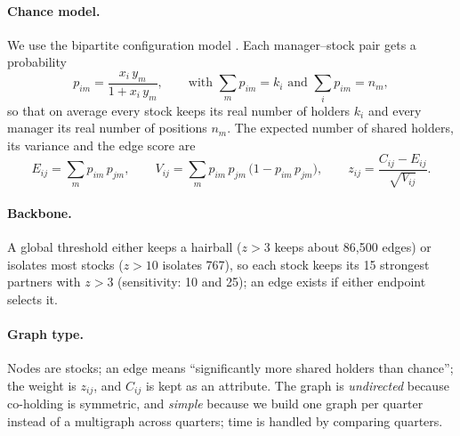 \documentclass[10pt,a4paper]{article}
\begin{document}
\paragraph{Chance model.} We use the bipartite configuration model \cite{saracco2015,saracco2017}. Each manager--stock pair gets a probability
\begin{equation}
  p_{im} = \frac{x_i\, y_m}{1 + x_i\, y_m},
  \qquad \text{with } \sum_m p_{im} = k_i \text{ and } \sum_i p_{im} = n_m ,
\end{equation}
so that on average every stock keeps its real number of holders $k_i$ and every manager its real number of positions $n_m$. The expected number of shared holders, its variance and the edge score are
\begin{equation}
  E_{ij} = \sum_m p_{im}\,p_{jm}, \qquad
  V_{ij} = \sum_m p_{im}\,p_{jm}\,\bigl(1 - p_{im}\,p_{jm}\bigr), \qquad
  z_{ij} = \frac{C_{ij} - E_{ij}}{\sqrt{V_{ij}}} .
\end{equation}

\paragraph{Backbone.} A global threshold either keeps a hairball ($z>3$ keeps about 86,500 edges) or isolates most stocks ($z>10$ isolates 767), so each stock keeps its 15 strongest partners with $z>3$ (sensitivity: 10 and 25); an edge exists if either endpoint selects it.

\paragraph{Graph type.} Nodes are stocks; an edge means ``significantly more shared holders than chance''; the weight is $z_{ij}$, and $C_{ij}$ is kept as an attribute. The graph is \emph{undirected} because co-holding is symmetric, and \emph{simple} because we build one graph per quarter instead of a multigraph across quarters; time is handled by comparing quarters.
\end{document}
